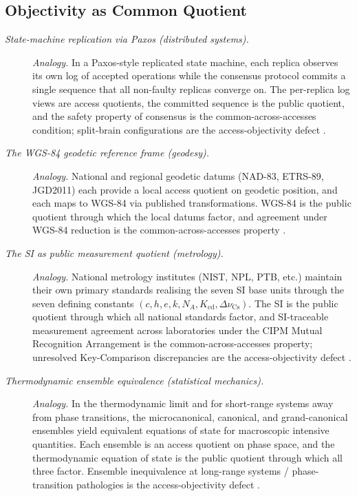 \subsection*{ Objectivity as Common Quotient}
\begingroup\small
\begin{description}
\item[\emph{State-machine replication via Paxos (distributed
systems).}] \textit{Analogy.}
In a Paxos-style replicated state machine, each replica observes
its own log of accepted operations while the consensus protocol
commits a single sequence that all non-faulty replicas converge
on.  The per-replica log views are  access quotients, the
committed sequence is the public quotient, and the safety property
of consensus is the common-across-accesses condition; split-brain
configurations are the  access-objectivity defect
\citep{Lamport1998PartTimeParliament}.

\item[\emph{The {WGS-84} geodetic reference frame (geodesy).}] \textit{Analogy.}
National and regional geodetic datums (NAD-83, ETRS-89, JGD2011)
each provide a local access quotient on geodetic position, and
each maps to WGS-84 via published transformations.  WGS-84 is the
 public quotient through which the local datums factor, and
agreement under WGS-84 reduction is the common-across-accesses
property
\citep{NGA2014WGS84}.

\item[\emph{The {SI} as public measurement quotient (metrology).}] \textit{Analogy.}
National metrology institutes (NIST, NPL, PTB, etc.) maintain
their own primary standards realising the seven SI base units
through the seven defining constants
\((c,h,e,k,N_A,K_{\mathrm{cd}},\Delta\nu_{\mathrm{Cs}})\).  The SI
is the public quotient through which all national standards
factor, and SI-traceable measurement agreement across laboratories
under the CIPM Mutual Recognition Arrangement is the 
common-across-accesses property; unresolved Key-Comparison
discrepancies are the access-objectivity defect
\citep{BIPM2019SIBrochure}.

\item[\emph{Thermodynamic ensemble equivalence (statistical
mechanics).}] \textit{Analogy.}
In the thermodynamic limit and for short-range systems away from
phase transitions, the microcanonical, canonical, and grand-canonical
ensembles yield equivalent equations of state for macroscopic
intensive quantities.  Each ensemble is an access quotient on
phase space, and the thermodynamic equation of state is the 
public quotient through which all three factor.  Ensemble
inequivalence at long-range systems / phase-transition
pathologies is the access-objectivity defect
\citep{Ruelle1969StatisticalMechanics}.
\end{description}
\endgroup

